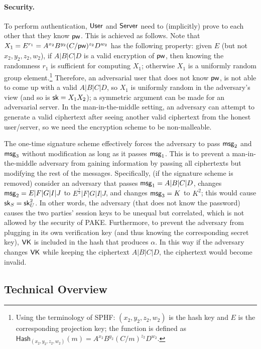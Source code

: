 \paragraph{Security.}
To perform authentication, $\mathsf{User}$ and $\mathsf{Server}$ need to (implicitly) prove to each other that they know $\mathsf{pw}$. This is achieved as follows. Note that $X_1 = E^{r_1} = A^{x_2}B^{y_2}(C/\mathsf{pw})^{z_2}D^{w_2}$ has the following property: given $E$ (but not $x_2,y_2,z_2,w_2$), if $A|B|C|D$ is a valid encryption of $\mathsf{pw}$, then knowing the randomness $r_1$ is sufficient for computing $X_1$; otherwise $X_1$ is a uniformly random group element.\footnote{Using the terminology of SPHF: $(x_2,y_2,z_2,w_2)$ is the hash key and $E$ is the corresponding projection key; the function is defined as $\mathsf{Hash}_{(x_2,y_2,z_2,w_2)}(m) = A^{x_2}B^{y_2}(C/m)^{z_2}D^{w_2}$.} Therefore, an adversarial user that does not know $\mathsf{pw}$, is not able to come up with a valid $A|B|C|D$, so $X_1$ is uniformly random in the adversary's view (and so is $\mathsf{sk} = X_1X_2$); a symmetric argument can be made for an adversarial server. In the man-in-the-middle setting, an adversary can attempt to generate a valid ciphertext after seeing another valid ciphertext from the honest user/server, so we need the encryption scheme to be non-malleable.

The one-time signature scheme effectively forces the adversary to pass $\mathsf{msg}_{2}$ and $\mathsf{msg}_{3}$ without modification as long as it passes $\mathsf{msg}_{1}$. This is to prevent a man-in-the-middle adversary from gaining information by passing all ciphertexts but modifying the rest of the messages. Specifically, (if the signature scheme is removed) consider an adversary that passes $\mathsf{msg}_{1} = A|B|C|D$, changes $\mathsf{msg}_{2} = E|F|G|I|J$ to $E^{\frac{1}{2}}|F|G|I|J$, and changes $\mathsf{msg}_{3} = K$ to $K^2$; this would cause $\mathsf{sk}_S = \mathsf{sk}_U^2$. In other words, the adversary (that does not know the password) causes the two parties' session keys to be unequal but correlated, which is not allowed by the security of PAKE. Furthermore, to prevent the adversary from plugging in its own verification key (and thus knowing the corresponding secret key), $\mathsf{VK}$ is included in the hash that produces $\alpha$. In this way if the adversary changes $\mathsf{VK}$ while keeping the ciphertext $A|B|C|D$, the ciphertext would become invalid.

\subsection{Technical Overview}

